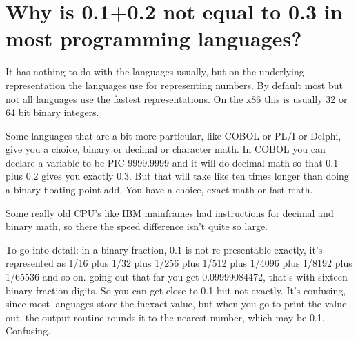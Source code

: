 \section{Why is 0.1+0.2 not equal to 0.3 in most programming languages?}

It has nothing to do with the languages usually, but on the underlying representation the languages use for representing numbers.  By default most but not all languages use the fastest representations.  On the x86 this is usually 32 or 64 bit binary integers.

Some languages that are a bit more particular, like COBOL or PL/I or Delphi,  give you a choice,  binary or decimal or character math.  In COBOL you can declare a variable to be PIC 9999.9999  and it will do decimal math so that 0.1 plus 0.2 gives you exactly 0.3.    But that will take like ten times longer than doing a binary floating-point add.    You have a choice, exact math or fast math.

Some really old CPU's like IBM mainframes had instructions for decimal and binary math, so there the speed difference isn't quite so large.

To go into detail:  in a binary fraction, 0.1 is not re-presentable exactly, it's represented as 1/16 plus 1/32 plus 1/256 plus 1/512 plus 1/4096 plus 1/8192 plus 1/65536 and so on.  going out that far you get 0.09999084472, that's with sixteen binary fraction digits.  So you can get close to 0.1 but not exactly.      It's confusing, since most languages store the inexact value, but when you go to print the value out, the output routine rounds it to the nearest number, which may be 0.1.    Confusing.